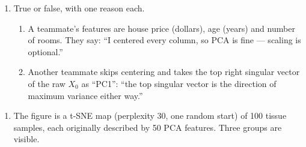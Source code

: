 \documentclass[
  11pt,
]{article}
\providecommand{\tightlist}{%
  \setlength{\itemsep}{0pt}\setlength{\parskip}{0pt}}
\newcommand{\answerspace}[1]{\par\vspace*{#1}}  %
\begin{document}
\begin{enumerate}
\def\labelenumi{(\alph{enumi})}
\setcounter{enumi}{1}
\item
  True or false, with one reason each.

  \begin{enumerate}
  \def\labelenumii{(\roman{enumii})}
  \item
    A teammate's features are house price (dollars), age (years) and
    number of rooms. They say: ``I centered every column, so PCA is fine
    --- scaling is optional.''
  \item
    Another teammate skips centering and takes the top right singular
    vector of the raw \(X_0\) as ``PC1'': ``the top singular vector is
    the direction of maximum variance either way.''
  \end{enumerate}
\end{enumerate}

\answerspace{1.8in}

\begin{enumerate}
\def\labelenumi{(\alph{enumi})}
\setcounter{enumi}{2}
\tightlist
\item
  The figure is a t-SNE map (perplexity 30, one random start) of 100
  tissue samples, each originally described by 50 PCA features. Three
  groups are visible.
\end{enumerate}
\end{document}
